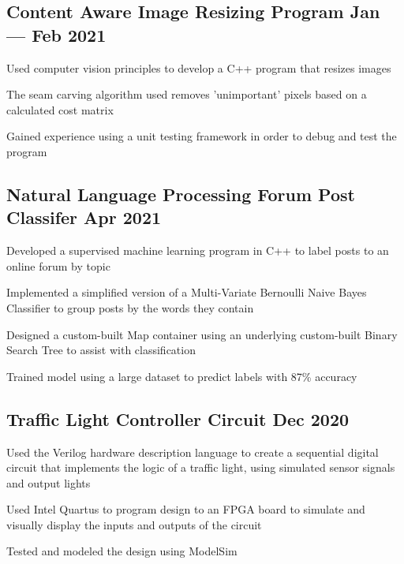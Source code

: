 \documentclass[letter,10pt]{article}
\begin{document}
\subsection{{Content Aware Image Resizing Program \hfill Jan --- Feb 2021}}
\begin{zitemize}
\item Used computer vision principles to develop a C++ program that resizes images
\item The seam carving algorithm used removes 'unimportant' pixels based on a calculated cost matrix 
\item Gained experience using a unit testing framework in order to debug and test the program
\end{zitemize}

\subsection{{Natural Language Processing Forum Post Classifer \hfill Apr 2021}}
\begin{zitemize}
\item Developed a supervised machine learning program in C++ to label posts to an online forum by topic
\item Implemented a simplified version of a Multi-Variate Bernoulli Naive Bayes Classifier to group posts by the words they contain
\item Designed a custom-built Map container using an underlying custom-built Binary Search Tree to assist with classification
\item Trained model using a large dataset to predict labels with 87\% accuracy
\end{zitemize}

\subsection{{Traffic Light Controller Circuit \hfill Dec 2020}}
\begin{zitemize}
\item Used the Verilog hardware description language to create a sequential digital circuit that implements the logic of a traffic light, using simulated sensor signals and output lights
\item Used Intel Quartus to program design to an FPGA board to simulate and visually display the inputs and outputs of the circuit
\item Tested and modeled the design using ModelSim
\end{zitemize}
\end{document}

